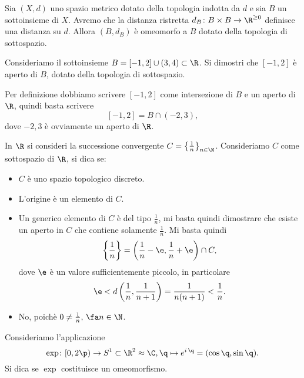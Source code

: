\begin{oss}
	Sia \((X,d)\) uno spazio metrico dotato della topologia indotta da \(d\) e sia \(B\) un sottoinsieme di \(X\).
	Avremo che la distanza ristretta \(d_B\colon B\times B\to\R^{\ge 0}\) definisce una distanza su \(d\).
	Allora \((B,d_B)\) è omeomorfo a \(B\) dotato della topologia di sottospazio.
\end{oss}

\begin{ese}
	Consideriamo il sottoinsieme \(B=[-1,2]\cup(3,4)\subset\R\).
	Si dimostri che \([-1,2]\) è aperto di \(B\), dotato della topologia di sottospazio.
\end{ese}

\begin{sol}
	Per definizione dobbiamo scrivere \([-1,2]\) come intersezione di \(B\) e un aperto di \(\R\), quindi basta scrivere
	\[
		[-1,2]=B\cap(-2,3),
	\]
	dove \(-2,3\) è ovviamente un aperto di \(\R\).
\end{sol}

\begin{ese}
	In \(\R\) si consideri la successione convergente \(C=\left\{\frac{1}{n}\right\}_{n\in\N}\).
	Consideriamo \(C\) come sottospazio di \(\R\), si dica se:
	\begin{itemize}
		\item \(C\) è uno spazio topologico discreto.
		\item L'origine è un elemento di \(C\).
	\end{itemize}
\end{ese}

\begin{sol}
	\begin{itemize}
		\item Un generico elemento di \(C\) è del tipo \(\frac{1}{n}\), mi basta quindi dimostrare che esiste un aperto in \(C\) che contiene solamente \(\frac{1}{n}\).
		      Mi basta quindi
		      \[
			      \left\{\frac{1}{n}\right\}=\left(\frac{1}{n}-\e,\frac{1}{n}+\e\right)\cap C,
		      \]
		      dove \(\e\) è un valore sufficientemente piccolo, in particolare
		      \[
			      \e<d\left(\frac{1}{n},\frac{1}{n+1}\right)=\frac{1}{n(n+1)}<\frac{1}{n}.
		      \]
		\item No, poichè \(0\neq \frac{1}{n},\,\fa n\in\N\).
	\end{itemize}
\end{sol}

\begin{ese}
	Consideriamo l'applicazione
	\[
		\exp\colon [0,2\p)\to S^1\subset \R^2\approx \C,\q\mapsto e^{i\,\q}=(\cos\q,\sin\q).
	\]
	Si dica se \(\exp\) costituisce un omeomorfismo.
\end{ese}

